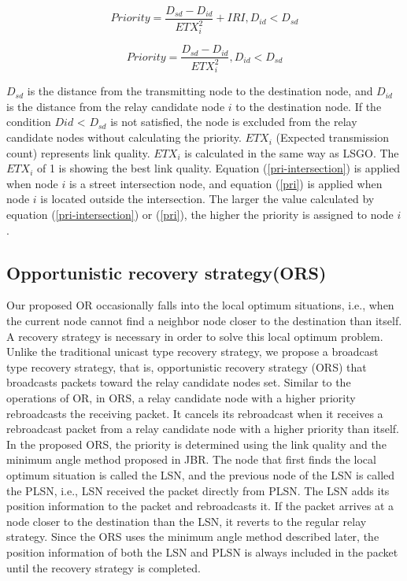 \documentclass{comex}
\begin{document}
\begin{equation}
\label{pri-intersection}
Priority = \frac{D_{sd} - D_{id}}{ETX_{i}^{2}} + IRI,  D_{id} < D_{sd}
\end{equation}

\begin{equation}
\label{pri}
Priority = \frac{D_{sd} - D_{id}}{ETX_{i}^{2}} ,   D_{id} < D_{sd}
\end{equation}

$D_{sd}$ is the distance from the transmitting node to the destination node, and $D_{id}$ is the distance from the relay candidate node $i$ to the destination node. If the condition $D{id}$ < $D_{sd}$ is not satisfied, the node is excluded from the relay candidate nodes without calculating the priority. 
$ETX_i$ (Expected transmission count) represents link quality. $ETX_i$ is calculated in the same way as LSGO. 
The $ETX_i$ of 1 is showing the best link quality.
Equation (\ref{pri-intersection}) is applied when node $i$ is a street intersection node, and equation (\ref{pri}) is applied when node $i$ is located outside the intersection. 
The larger the value calculated by equation (\ref{pri-intersection}) or (\ref{pri}), the higher the priority is assigned to node $i$. 


\subsection{Opportunistic recovery strategy(ORS)}

Our proposed OR occasionally falls into the local optimum situations, i.e., when the current node cannot find a neighbor node closer to the destination than itself. A recovery strategy is necessary in order to solve this local optimum problem. Unlike the traditional unicast type recovery strategy, we propose a broadcast type recovery strategy, that is, opportunistic recovery strategy (ORS) that broadcasts packets toward the relay candidate nodes set. Similar to the operations of OR, in ORS, a relay candidate node with a higher priority rebroadcasts the receiving packet. It cancels its rebroadcast when it receives a rebroadcast packet from a relay candidate node with a higher priority than itself.  
In the proposed ORS, the priority is determined using the link quality and the minimum angle method proposed in JBR. 
The node that first finds the local optimum situation is called the LSN,
and the previous node of the LSN is called the PLSN, i.e., LSN received the packet directly from PLSN. The LSN adds its position information to the packet and rebroadcasts it. If the packet arrives at a node closer to the destination than the LSN, it reverts to the regular relay strategy. Since the ORS uses the minimum angle method described later, the position information of both the LSN and PLSN is always included in the packet until the recovery strategy is completed.
\end{document}
